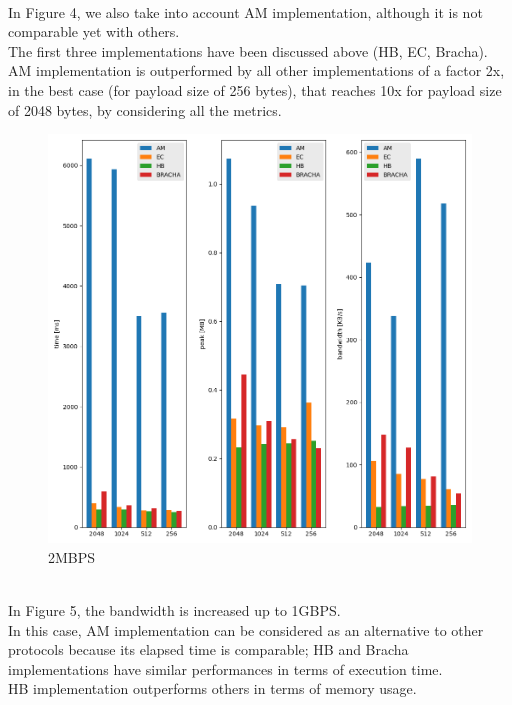 \documentclass[12pt]{article}
\begin{document}
\\
In Figure 4, we also take into account AM implementation, although it is not comparable yet with others. \\
The first three implementations have been discussed above (HB, EC, Bracha). \\
AM implementation is outperformed by all other implementations of a factor 2x, in the best case (for payload size of 256 bytes), that reaches 10x for payload size of 2048 bytes, by considering all the metrics. \\
\begin{figure}
\centering
\includegraphics[scale=0.4]{BAR-BW-2MB-20-proc.png}
\caption{2MBPS}
\label{fig:mesh4}
\end{figure}
\\
In Figure 5, the bandwidth is increased up to 1GBPS. \\
In this case, AM implementation can be considered as an alternative to other protocols because its elapsed time is comparable; HB and Bracha implementations have similar performances in terms of execution time.\\
HB implementation outperforms others in terms of memory usage.\\
\end{document}
